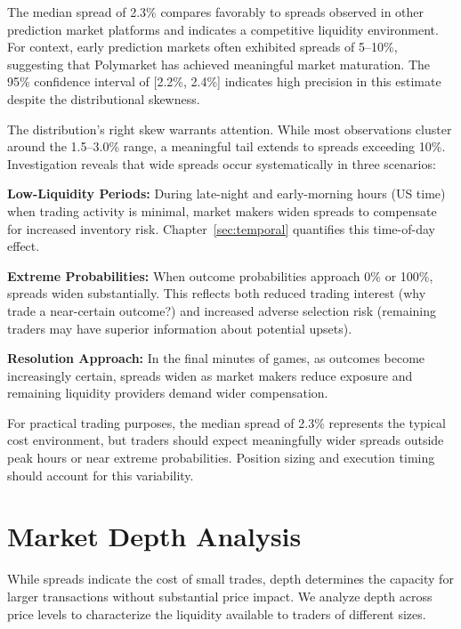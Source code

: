 The median spread of 2.3\% compares favorably to spreads observed in other prediction market platforms and indicates a competitive liquidity environment. For context, early prediction markets often exhibited spreads of 5--10\%, suggesting that Polymarket has achieved meaningful market maturation. The 95\% confidence interval of [2.2\%, 2.4\%] indicates high precision in this estimate despite the distributional skewness.

The distribution's right skew warrants attention. While most observations cluster around the 1.5--3.0\% range, a meaningful tail extends to spreads exceeding 10\%. Investigation reveals that wide spreads occur systematically in three scenarios:

\textbf{Low-Liquidity Periods:} During late-night and early-morning hours (US time) when trading activity is minimal, market makers widen spreads to compensate for increased inventory risk. Chapter~\ref{sec:temporal} quantifies this time-of-day effect.

\textbf{Extreme Probabilities:} When outcome probabilities approach 0\% or 100\%, spreads widen substantially. This reflects both reduced trading interest (why trade a near-certain outcome?) and increased adverse selection risk (remaining traders may have superior information about potential upsets).

\textbf{Resolution Approach:} In the final minutes of games, as outcomes become increasingly certain, spreads widen as market makers reduce exposure and remaining liquidity providers demand wider compensation.

For practical trading purposes, the median spread of 2.3\% represents the typical cost environment, but traders should expect meaningfully wider spreads outside peak hours or near extreme probabilities. Position sizing and execution timing should account for this variability.

\section{Market Depth Analysis}

While spreads indicate the cost of small trades, depth determines the capacity for larger transactions without substantial price impact. We analyze depth across price levels to characterize the liquidity available to traders of different sizes.

